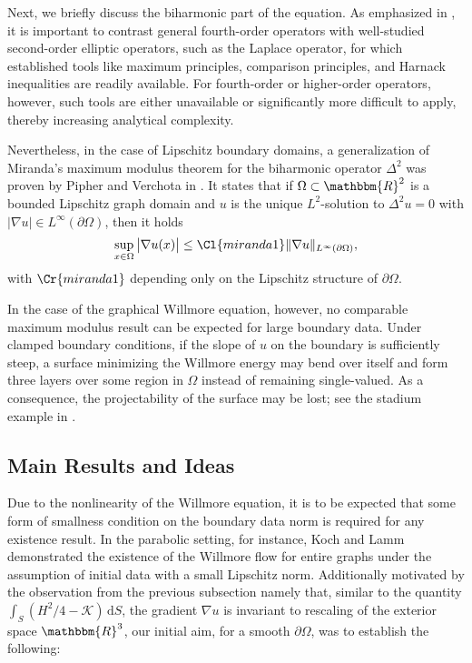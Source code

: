 \documentclass[12pt,a4paper,twoside]{article}
\newcommand{\R}{\mathbbm {R}}
\begin{document}
Next, we briefly discuss the biharmonic part of the equation. As emphasized in \cite{grunau2018boundary}, it is important to contrast general fourth-order operators with well-studied second-order elliptic operators, such as the Laplace operator, for which established tools like maximum principles, comparison principles, and Harnack inequalities are readily available. For fourth-order or higher-order operators, however, such tools are either unavailable or significantly more difficult to apply, thereby increasing analytical complexity.

Nevertheless, in the case of Lipschitz boundary domains, a generalization of Miranda’s maximum modulus theorem for the biharmonic operator $\Delta^2$ was proven by Pipher and Verchota in \cite{Pipher1993}. It states that if $\Omega\subset \R^2$ is a bounded Lipschitz graph domain and $u$ is the unique $L^2$-solution to $\Delta^2 u=0$ with  $|\nabla u| \in L^\infty(\partial\Omega)$, then it holds
\begin{align*}
    \sup_{x\in \Omega} \big| \nabla  u (x) \big| \le \Cl{miranda1} \| \nabla  u \|_{L^\infty(\partial\Omega)},
\end{align*}
with $\Cr{miranda1}$ depending only on the Lipschitz structure of $\partial\Omega$.

In the case of the graphical Willmore equation, however, no comparable maximum modulus result can be expected for large boundary data. Under clamped boundary conditions, if the slope of $u$ on the boundary is sufficiently steep, a surface minimizing the Willmore energy may bend over itself and form three layers over some region in $\Omega$ instead of remaining single-valued. As a consequence, the projectability of the surface may be lost; see the stadium example in \cite[p. 1690 and Fig. 8]{barrett2017}.

\subsection{Main Results and Ideas}
Due to the nonlinearity of the Willmore equation, it is to be expected that some form of smallness condition on the boundary data norm is required for any existence result. In the parabolic setting, for instance, Koch and Lamm \cite{koch2012geometric} demonstrated the existence of the Willmore flow for entire graphs under the assumption of initial data with a small Lipschitz norm. Additionally motivated by the observation from the previous subsection namely that, similar to the quantity \(
\int_S \left({H^2}/{4} - \mathcal{K}\right) \, \mathrm{d}S
\), the gradient  $\nabla u$ is invariant to rescaling of the exterior space $ \R^3$, our initial aim, for a smooth $\partial\Omega$, was to establish the following:
\end{document}
